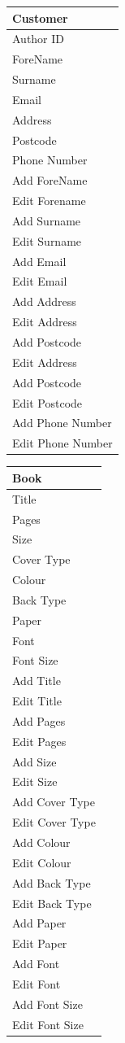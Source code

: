 \begin{tabular}{|p{2.5cm}|}
    \hline
    \textbf{Customer} \\ \hline
    Author ID \\ ForeName \\ Surname \\ Email \\ Address \\ Postcode \\ Phone Number \\ \hline
    Add ForeName \\ Edit Forename \\ Add Surname \\ Edit Surname \\ Add Email \\ Edit Email \\ Add Address \\ Edit Address \\ Add Postcode \\ Edit Address \\ Add Postcode \\ Edit Postcode \\ Add Phone Number \\ Edit Phone Number \\ \hline
    \hline
\end{tabular}

\begin{tabular}{|p{2.5cm}|}
    \hline
    \textbf{Book} \\ \hline
    Title \\ Pages \\ Size \\ Cover Type \\ Colour \\ Back Type \\ Paper \\ Font \\ Font Size \\ \hline
    Add Title \\ Edit Title \\ Add Pages \\ Edit Pages \\ Add Size \\ Edit Size \\ Add Cover Type \\ Edit Cover Type \\ Add Colour \\ Edit Colour \\ Add Back Type \\ Edit Back Type \\ Add Paper \\ Edit Paper \\ Add Font \\ Edit Font \\ Add Font Size \\ Edit Font Size\\ \hline
    \hline
\end{tabular}

